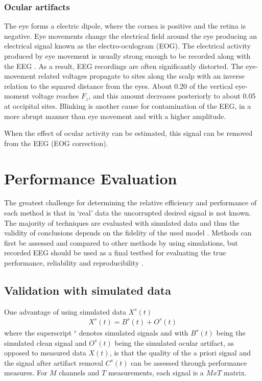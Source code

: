 \documentclass[twoside]{article}
\begin{document}
\subsubsection{Ocular artifacts}
The eye forms a electric dipole, where the cornea is positive and the retina is negative. Eye movements change the electrical field around the eye producing an electrical signal known as the electro-oculogram (EOG). 
The electrical activity produced by eye movement is usually strong enough to be recorded along with the EEG \cite{ocularartifacts}. As a result, EEG recordings are often significantly distorted. The eye-movement related voltages propagate to sites along the scalp with an inverse relation to the squared distance from the eyes. About 0.20 of the vertical eye-moment voltage reaches $F_z$, and this amount decreases posteriorly to about 0.05 at occipital sites. Blinking is another cause for contamination of the EEG, in a more abrupt manner than eye movement and with a higher amplitude. 

When the effect of ocular activity can be estimated, this signal can be removed from the EEG (EOG correction). 

\section{Performance Evaluation}
The greatest challenge for determining the relative efficiency and performance of each method is that in `real' data the uncorrupted desired signal is not known. The majority of techniques are evaluated with simulated data and thus the validity of conclusions depends on the fidelity of the used model \cite{eval}. Methods can first be assessed and compared to other methods by using simulations, but recorded EEG should be used as a final testbed for evaluating the true performance, reliability and reproducibility \cite{eegguidelines}. 


\subsection{Validation with simulated data}
One advantage of using simulated data $X^s(t)$ \begin{align} X^s(t) = B^s(t) + O^s(t) \end{align} where the superscript $^s$ denotes simulated signals and with $B^s(t)$ being the simulated clean signal and $O^s(t)$ being the simulated ocular artifact, as opposed to measured data $X(t)$, is that the quality of the a priori signal  and the signal after artifact removal $C^s(t)$ can be assessed through performance measures. For $M$ channels and $T$ measurements, each signal is a $MxT$ matrix. 
\end{document}
